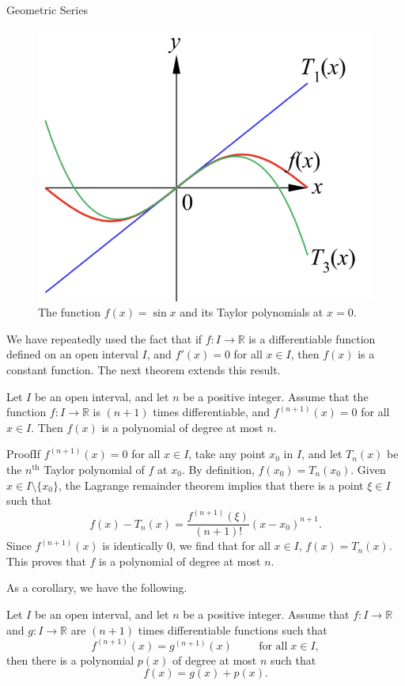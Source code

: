 \begin{example}[label=230305_16]{Geometric Series}
\begin{example}[label=230304_9]{}
\begin{example}{}
\begin{example}{}
\begin{figure}[ht]
\centering
\includegraphics[scale=0.2]{Picture60.png}
\caption{The function $f(x)=\sin x$ and its Taylor polynomials at $x=0$.\fa}\label{figure60}
\end{figure}

  We have repeatedly used the fact that if $f:I\to\mathbb{R}$ is a differentiable function defined on an open interval $I$, and $f'(x)=0$ for all $x\in I$, then $f(x)$ is a constant function. The next theorem extends this result.
\begin{theorem}[label=230307_17]{}
Let $I$ be an open interval, and let $n$ be a positive integer. Assume that the function $f:I\to\mathbb{R}$ is $(n+1)$ times differentiable, and
$f^{(n+1)}(x)=0$ for all $x\in I$. Then $f(x)$ is a polynomial of degree at most $n$.
\end{theorem} 
\begin{myproof}{Proof}If $f^{(n+1)}(x)=0$ for all $x\in I$, take any point $x_0$  in $I$, and let $T_n(x)$ be the $n^{\text{th}}$ Taylor polynomial of $f$ at $x_0$. By definition, $f(x_0)=T_n(x_0)$. Given $x\in I\setminus\{x_0\}$, the Lagrange remainder theorem implies that there is a point $\xi\in I$ such that
\[f(x)-T_n(x)=\frac{f^{(n+1)}(\xi)}{(n+1)!}(x-x_0)^{n+1}.\]
Since $f^{(n+1)}(x)$ is identically 0, we find that for all $x\in I$, 
$f(x)=T_n(x)$. This proves that $f$ is a polynomial of degree at most $n$.

\end{myproof}

As a corollary, we have the following.
\begin{corollary}{}
Let $I$ be an open interval, and let $n$ be a positive integer. Assume that $f:I\to\mathbb{R}$ and $g:I\to\mathbb{R}$ are $(n+1)$ times differentiable functions such that
\[f^{(n+1)}(x)=g^{(n+1)}(x)\hspace{1cm}\text{for all}\;x\in I,\] then there is a polynomial $p(x)$ of degree at most $n$ such that
\[f(x)=g(x)+p(x).\]
\end{corollary}


\end{example}
\end{example}
\end{example}
\end{example}

